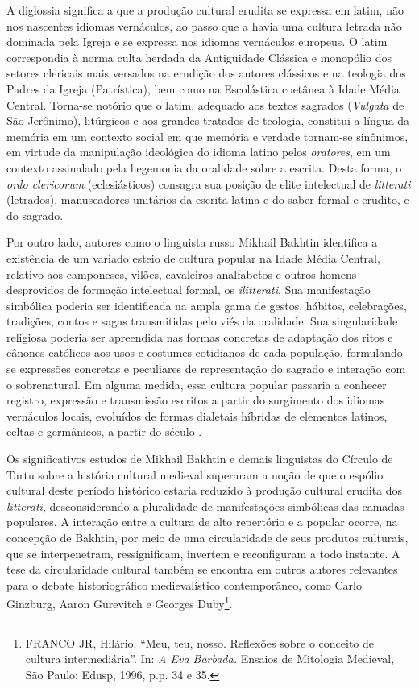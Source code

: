 A diglossia significa a que a produção cultural erudita se expressa em latim,
não nos nascentes idiomas vernáculos, ao passo que a havia uma cultura letrada
não dominada pela Igreja e se expressa nos idiomas vernáculos europeus. O latim
correspondia à norma culta herdada da Antiguidade Clássica e monopólio dos
setores clericais mais versados na erudição dos autores clássicos e na teologia
dos Padres da Igreja (Patrística), bem como na Escolástica coetânea à Idade
Média Central. Torna-se notório que o latim, adequado aos textos sagrados
(\textit{Vulgata} de São Jerônimo), litúrgicos e aos grandes tratados de
teologia, constitui a língua da memória em um contexto social em que memória e
verdade tornam-se sinônimos, em virtude da manipulação ideológica do idioma
latino pelos \textit{oratores}, em um contexto assinalado pela hegemonia da
oralidade sobre a escrita. Desta forma, o \textit{ordo clericorum}
(eclesiásticos) consagra sua posição de elite intelectual de \textit{litterati
}(letrados), manuseadores unitários da escrita latina e do saber formal e
erudito, e do sagrado. 

Por outro lado, autores como o linguista russo Mikhail Bakhtin identifica a
existência de um variado esteio de cultura popular na Idade Média Central,
relativo aos camponeses, vilões, cavaleiros analfabetos e outros homens
desprovidos de formação intelectual formal, os \textit{ilitterati}. Sua
manifestação simbólica poderia ser identificada na ampla gama de gestos,
hábitos, celebrações, tradições, contos e sagas transmitidas pelo viés da
oralidade. Sua singularidade religiosa poderia ser apreendida nas formas
concretas de adaptação dos ritos e cânones católicos aos usos e costumes
cotidianos de cada população, formulando-se expressões concretas e peculiares
de representação do sagrado e interação com o sobrenatural. Em alguma medida,
essa cultura popular passaria a conhecer registro, expressão e transmissão
escritos a partir do surgimento dos idiomas vernáculos locais, evoluídos de
formas dialetais híbridas de elementos latinos, celtas e germânicos, a partir
do século . 

Os significativos estudos de Mikhail Bakhtin e demais linguistas do Círculo de
Tartu sobre a história cultural medieval superaram a noção de que o espólio
cultural deste período histórico estaria reduzido à produção cultural erudita
dos \textit{litterati}, desconsiderando a pluralidade de manifestações
simbólicas das camadas populares. A interação entre a cultura de alto
repertório e a popular ocorre, na concepção de Bakhtin, por meio de uma
circularidade de seus produtos culturais, que se interpenetram, ressignificam,
invertem e reconfiguram a todo instante. A tese da circularidade cultural
também se encontra em outros autores relevantes para o debate historiográfico
medievalístico contemporâneo, como Carlo Ginzburg, Aaron Gurevitch e Georges
Duby\footnote{ FRANCO JR, Hilário. “Meu, teu, nosso. Reflexões sobre o conceito
de cultura intermediária”. In: \textit{A Eva Barbada. }Ensaios de Mitologia
Medieval, São Paulo: Edusp, 1996, p.p. 34 e 35.  }.

